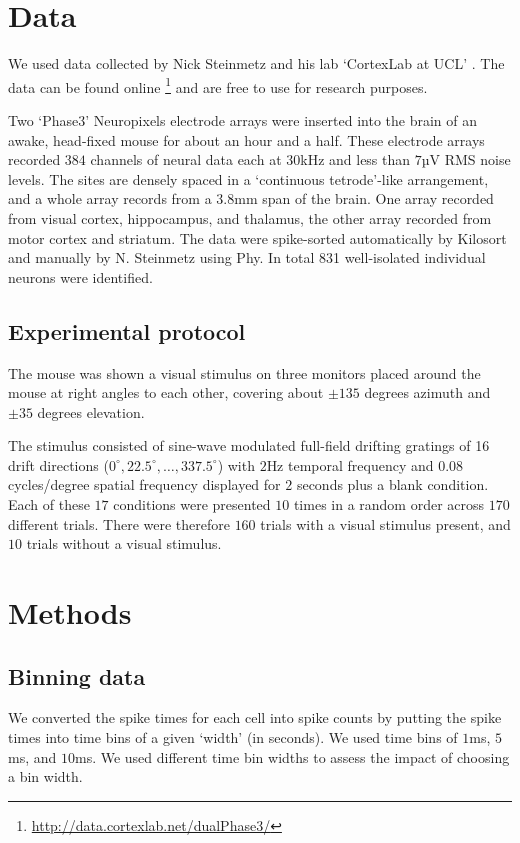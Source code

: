 \documentclass[a4paper,12pt]{article}
\theoremstyle{definition}
\begin{document}
\section{Data}
We used data collected by Nick Steinmetz and his lab `CortexLab at UCL' \cite{steinmetz}. The data can be found online \footnote{\url{http://data.cortexlab.net/dualPhase3/}} and are free to use for research purposes.

Two `Phase3' Neuropixels \cite{jun} electrode arrays were inserted into the brain of an awake, head-fixed mouse for about an hour and a half. These electrode arrays recorded $384$ channels of neural data each at $30$kHz and  less than $7$µV RMS noise levels. The sites are densely spaced in a `continuous tetrode'-like arrangement, and a whole array records from a $3.8$mm span of the brain. One array recorded from visual cortex, hippocampus,  and thalamus, the other array recorded from motor cortex and striatum. The data were spike-sorted automatically by Kilosort and manually by N. Steinmetz using Phy. In total 831 well-isolated individual neurons were identified.

  \subsection{Experimental protocol}
  The mouse was shown a visual stimulus on three monitors placed around the mouse at right angles to each other, covering about $\pm 135$ degrees azimuth and $\pm 35$ degrees elevation.

  The stimulus consisted of sine-wave modulated full-field drifting gratings of 16 drift directions ($0^{\circ}, 22.5^{\circ}, \dots, 337.5^{\circ}$) with $2$Hz temporal frequency and $0.08$ cycles/degree spatial frequency displayed for $2$ seconds plus a blank condition. Each of these $17$ conditions were presented $10$ times in a random order across $170$ different trials. There were therefore $160$ trials with a visual stimulus present, and $10$ trials without a visual stimulus.

\section{Methods}

    \subsection{Binning data}
    We converted the spike times for each cell into spike counts by putting the spike times into time bins of a given `width' (in seconds). We used time bins of $1$ms, $5$ms, and $10$ms. We used different time bin widths to assess the impact of choosing a bin width.
\end{document}
